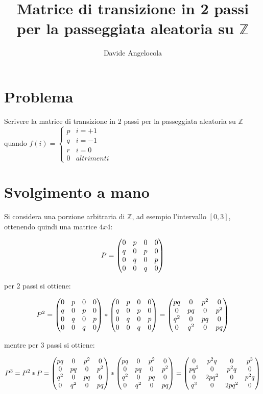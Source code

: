 \documentclass{article}
\title{Matrice di transizione in 2 passi per la passeggiata aleatoria su $\mathbb{Z}$}
\author{Davide Angelocola}
\begin{document}
\maketitle

\section{Problema}
Scrivere la matrice di transizione in 2 passi per la passeggiata aleatoria su  $\mathbb{Z}$ quando $f(i)= \begin{cases}
	p & i = +1     \\
	q & i = -1     \\
	r & i = 0      \\
	0 & altrimenti 
	\end{cases}
$

\section{Svolgimento a mano}
Si considera una porzione arbitraria di $\mathbb{Z}$, ad esempio l'intervallo $[0, 3]$, ottenendo quindi una matrice $4x4$:

$$P = \begin{pmatrix}0 & p & 0 & 0\cr q & 0 & p & 0\cr 0 & q & 0 & p \cr 0 & 0 & q & 0 \end{pmatrix}$$

per 2 passi si ottiene:

$$P^2 = \begin{pmatrix}0 & p & 0 & 0\cr q & 0 & p & 0\cr 0 & q & 0 & p \cr 0 & 0 & q & 0 \end{pmatrix} * \begin{pmatrix}0 & p & 0 & 0\cr q & 0 & p & 0\cr 0 & q & 0 & p \cr 0 & 0 & q & 0 \end{pmatrix} = \begin{pmatrix}pq & 0 & p^2 & 0\cr 0 & pq & 0 & p^2\cr q^2 & 0 & pq & 0 \cr 0 & q^2 & 0 & pq \end{pmatrix} $$

mentre per 3 passi si ottiene:

$$P^3 = P^2 * P =  \begin{pmatrix}pq & 0 & p^2 & 0\cr 0 & pq & 0 & p^2\cr q^2 & 0 & pq & 0 \cr 0 & q^2 & 0 & pq \end{pmatrix} * \begin{pmatrix}pq & 0 & p^2 & 0\cr 0 & pq & 0 & p^2\cr q^2 & 0 & pq & 0 \cr 0 & q^2 & 0 & pq \end{pmatrix} =  \begin{pmatrix}0 & p^2q & 0 & p^3\cr pq^2 & 0 & p^2q & 0\cr 0 & 2pq^2 & 0 & p^2q \cr q^3 & 0 & 2pq^2 & 0\end{pmatrix}$$
\end{document}
